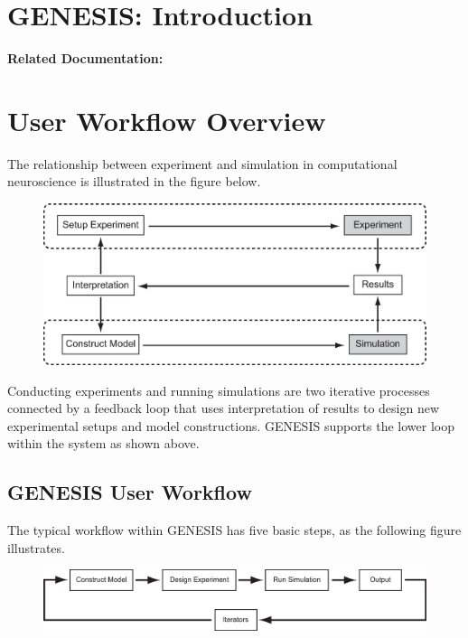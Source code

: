 \documentclass[12pt]{article}
\begin{document}
\section*{GENESIS: Introduction}

{\bf Related Documentation:}

\section*{User Workflow Overview}

The relationship between experiment and simulation in computational neuroscience is illustrated in the figure below.  

 \begin{figure}[h]
    \centering
    \includegraphics[scale=0.4]{figures/Exp-Sim-8.eps}
    \label{fig:df-1}
 \end{figure}

Conducting experiments and running simulations are two iterative processes connected by a feedback loop that uses interpretation of results to design new experimental setups and model constructions. GENESIS supports the lower loop within the system as shown above.

\subsection*{GENESIS User Workflow}

The typical workflow within GENESIS has five basic steps, as the following figure illustrates. 
 \begin{figure}[h]
    \centering
    \includegraphics[scale=0.5]{figures/workflow.eps}
    \label{fig:df-1}
 \end{figure}
\end{document}
